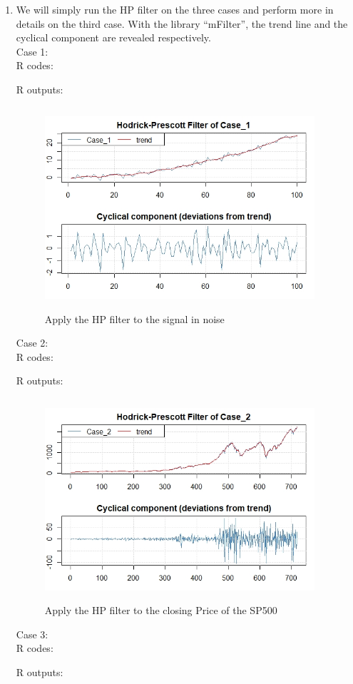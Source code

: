 \documentclass[10pt]{article}
\begin{document}
\begin{enumerate}[1)]
\item
We will simply run the HP filter on the three cases and perform more in details on the third case. With the library ``mFilter'', the trend line and the cyclical component are revealed respectively.\\
Case 1:\\
R codes:

R outputs:
\begin{figure}[H]
  \centering
  \includegraphics[width=10cm,height=7.5cm]{p17a.jpeg}
  \caption{Apply the HP filter to the signal in noise}
\end{figure}
Case 2:\\
R codes:

R outputs:
\begin{figure}[H]
  \centering
  \includegraphics[width=10cm,height=7.5cm]{p17b.jpeg}
  \caption{Apply the HP filter to the closing Price of the SP500}
\end{figure}
Case 3:\\
R codes:

R outputs:
\begin{figure}[H]
  \centering

\end{figure}
\end{enumerate}
\end{document}
